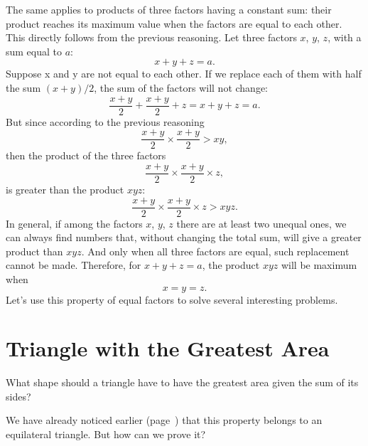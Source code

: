 The same applies to products of three factors having a constant sum: their product reaches its maximum value when the factors are equal to each other. This directly follows from the previous reasoning. Let three factors $x$, $y$, $z$, with a sum equal to $a$:
\begin{equation*}%
x + y + z = a.
\end{equation*}
Suppose x and y are not equal to each other. If we replace each of them with half the sum $(x + y) / 2$, the sum of the factors will not change:
\begin{equation*}%
\frac{x + y}{2} + \frac{x + y}{2} + z = x + y + z = a.
\end{equation*}
But since according to the previous reasoning
\begin{equation*}%
\frac{x + y}{2} \times\frac{x + y}{2} > xy,
\end{equation*}
then the product of the three factors
\begin{equation*}%
\frac{x + y}{2} \times\frac{x + y}{2} \times z,
\end{equation*}
is greater than the product $xyz$:
\begin{equation*}%
\frac{x + y}{2} \times\frac{x + y}{2} \times z > xyz.
\end{equation*}
In general, if among the factors $x$, $y$, $z$ there are at least two unequal ones, we can always find numbers that, without changing the total sum, will give a greater product than $xyz$. And only when all three factors are equal, such replacement cannot be made. Therefore, for $x + y + z = a$, the product $xyz$ will be maximum when
\begin{equation*}%
x = y = z.
\end{equation*}
Let's use this property of equal factors to solve several interesting problems.

\section{Triangle with the Greatest Area}
\label{sec-12.10}



\ques What shape should a triangle have to have the greatest area given the sum of its sides?

We have already noticed earlier (page~\pageref{sec-12.2}) that this property belongs to an equilateral triangle. But how can we prove it?



